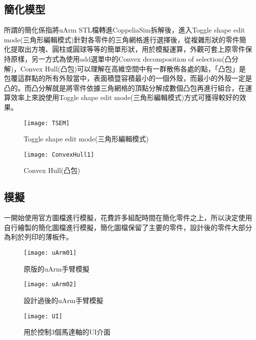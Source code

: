 \subsection{簡化模型}
 所謂的簡化係指將uArm STL檔轉進CoppeliaSim拆解後，進入Toggle shape edit mode(三角形編輯模式)針對各零件的三角網格進行選擇後，從複雜形狀的零件簡化提取出方塊、圓柱或圓球等等的簡單形狀，用於模擬運算，外觀可套上原零件保持原樣，另一方式為使用add選單中的Convex decomposition of selection(凸分解)，Convex Hull(凸包)可以理解在高維空間中有一群散佈各處的點，「凸包」是包覆這群點的所有外殼當中，表面積暨容積最小的一個外殼，而最小的外殼一定是凸的。而凸分解就是將零件依據三角網格的頂點分解成數個凸包再進行組合，在運算效率上來說使用Toggle shape edit mode(三角形編輯模式)方式可獲得較好的效果。\\

\begin{figure}[htb]
\begin{center}
\texttt{[image: TSEM]}
\caption{\Large Toggle shape edit mode(三角形編輯模式)}\label{TSEM}
\end{center}
\end{figure}

\begin{figure}[htb]
\begin{center}
\texttt{[image: ConvexHull1]}
\caption{\Large Convex Hull(凸包)}\label{ConvexHull1}
\end{center}
\end{figure}

\subsection{模擬}
 一開始使用官方圖檔進行模擬，花費許多組配時間在簡化零件之上，所以決定使用自行繪製的簡化圖檔進行模擬，簡化圖檔保留了主要的零件，設計後的零件大部分為利於列印的薄板件。\\
 
\begin{figure}[htb]
\begin{center}
\texttt{[image: uArm01]}
\caption{\Large 原版的uArm手臂模擬}\label{uArm01}
\end{center}
\end{figure}

\begin{figure}[htb]
\begin{center}
\texttt{[image: uArm02]}
\caption{\Large 設計過後的uArm手臂模擬}\label{uArm02}
\end{center}
\end{figure}

\begin{figure}[htb]
\begin{center}
\texttt{[image: UI]}
\caption{\Large 用於控制3個馬達軸的UI介面}\label{UI}
\end{center}
\end{figure}
\newpage


